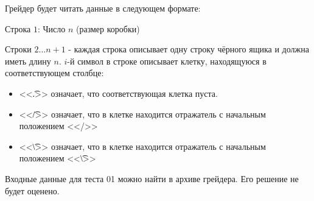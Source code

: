 Грейдер будет читать данные в следующем формате:

Строка $1$: Число $n$ (размер коробки)

Строки $2\dots n+1$ - каждая строка описывает одну строку чёрного ящика и должна иметь длину $n$. $i$-й символ в строке описывает клетку, находящуюся в соответствующем столбце:

\begin{itemize}
\item <<\t{.}>> означает, что соответствующая клетка пуста.
\item <<\t{/}>> означает, что в клетке находится отражатель с начальным положением <</>>
\item <<\t{\textbackslash}>> означает, что в клетке находится отражатель с начальным положением <<\t{\textbackslash}>>
\end{itemize}


Входные данные для теста 01 можно найти в архиве грейдера. Его решение не будет оценено.